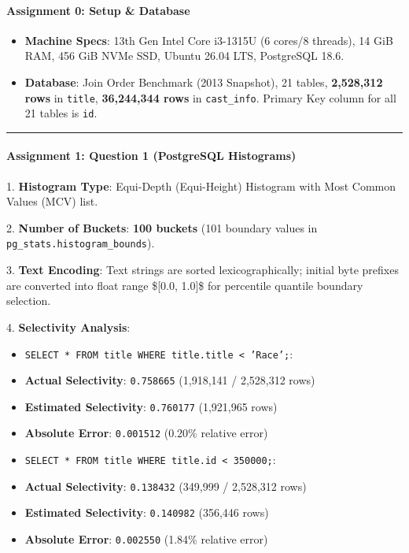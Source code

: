 \documentclass[11pt,a4paper]{article}
\begin{document}
{\paragraph{\textbf{Assignment 0: Setup \& Database}}
\begin{itemize}
\item \textbf{Machine Specs}: 13th Gen Intel Core i3-1315U (6 cores/8 threads), 14 GiB RAM, 456 GiB NVMe SSD, Ubuntu 26.04 LTS, PostgreSQL 18.6.
\item \textbf{Database}: Join Order Benchmark (2013 Snapshot), 21 tables, \textbf{2,528,312 rows} in \texttt{title}, \textbf{36,244,344 rows} in \texttt{cast\_info}. Primary Key column for all 21 tables is \texttt{id}.
\end{itemize}

\hrule


\paragraph{\textbf{Assignment 1: Question 1 (PostgreSQL Histograms)}}
1. \textbf{Histogram Type}: Equi-Depth (Equi-Height) Histogram with Most Common Values (MCV) list.

2. \textbf{Number of Buckets}: \textbf{100 buckets} (101 boundary values in \texttt{pg\_stats.histogram\_bounds}).

3. \textbf{Text Encoding}: Text strings are sorted lexicographically; initial byte prefixes are converted into float range \$[0.0, 1.0]\$ for percentile quantile boundary selection.

4. \textbf{Selectivity Analysis}:

\begin{itemize}
\item \texttt{SELECT * FROM title WHERE title.title < 'Race';}:
\item \textbf{Actual Selectivity}: \texttt{0.758665} (1,918,141 / 2,528,312 rows)
\item \textbf{Estimated Selectivity}: \texttt{0.760177} (1,921,965 rows)
\item \textbf{Absolute Error}: \texttt{0.001512} (0.20\% relative error)
\item \texttt{SELECT * FROM title WHERE title.id < 350000;}:
\item \textbf{Actual Selectivity}: \texttt{0.138432} (349,999 / 2,528,312 rows)
\item \textbf{Estimated Selectivity}: \texttt{0.140982} (356,446 rows)
\item \textbf{Absolute Error}: \texttt{0.002550} (1.84\% relative error)
\end{itemize}

}
\end{document}
